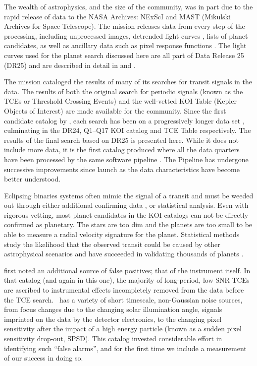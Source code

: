 The wealth of astrophysics, and the size of the \Kepler{} community, was in part due to the rapid release of \Kepler{} data to the NASA Archives: NExScI \citep[NASA Exoplanet Science Institute, ][]{Akeson2017} and MAST (Mikulski Archives for Space Telescope). The \Kepler{} mission releases data from every step of the processing, including unprocessed images, detrended light curves \citep{Stumpe2014}, lists of planet candidates, as well as ancillary data such as pixel response functions \citep{Bryson2010b}. The light curves used for the planet search discussed here are all part of Data Release 25 (DR25) and are described in detail in \citet{DRN25} and \citet{KDCH}.

The mission cataloged the results of many of its searches for transit signals in the data. The results of both the original search for periodic signals (known as the TCEs or Threshold Crossing Events) and the well-vetted KOI Table (Kepler Objects of Interest) are made available for the community.  Since the first candidate catalog by \citet{Borucki2011a}, each search has been on a progressively longer data set \citep{Batalha2013, Burke2014, Rowe2015cat, Mullally2015cat}, culminating in the DR24, Q1--Q17 KOI catalog \citet{Coughlin2016} and TCE Table \citep{Seader2015} respectively.  The results of the final search based on DR25 is presented here. While it does not include more data, it is the first catalog produced where all the data quarters have been processed by the same software pipeline \citep[version 9.3,][]{JenkinsKDPH}. The \Kepler{} Pipeline has undergone successive improvements since launch as the data characteristics have become better understood.

Eclipsing binaries systems often mimic the signal of a transit and must be weeded out through either additional confirming data \citep[such as radial velocities, e.g.][]{Marcy2014}, or statistical analysis. Even with rigorous vetting, most planet candidates in the KOI catalogs can not be directly confirmed as planetary. The stars are too dim and the planets are too small to be able to measure a radial velocity signature for the planet.   Statistical methods study the likelihood that the observed transit could be caused by other astrophysical scenarios and have succeeded in validating thousands of \Kepler{} planets \citep[e.g.][]{Morton2016, Torres2015,Lissauer2014, Rowe2014}.  

\citet{Mullally2015cat} first noted an additional source of false positives; that of the instrument itself. In that catalog (and again in this one), the majority of long-period, low SNR TCEs are ascribed to instrumental effects incompletely removed from the data before the TCE search. \Kepler\ has a variety of short timescale, non-Gaussian noise sources, from focus changes due to the changing solar illumination angle, signals imprinted on the data by the detector electronics, to the changing pixel sensitivity after the impact of a high energy particle (known as a sudden pixel sensitivity drop-out, SPSD). This catalog invested considerable effort in identifying such ``false alarms'', and for the first time we include a measurement of our success in doing so.

